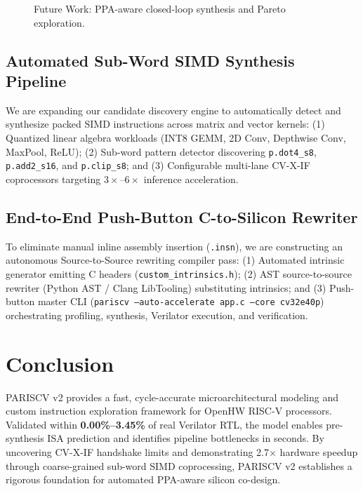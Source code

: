 \documentclass[conference]{IEEEtran}
\begin{document}
\begin{figure}[t]
\centering
{}
\vspace{-3pt}
\caption{Future Work: PPA-aware closed-loop synthesis and Pareto exploration.}
\label{fig:future_arch}
\vspace{-6pt}
\end{figure}

\subsection{Automated Sub-Word SIMD Synthesis Pipeline}
We are expanding our candidate discovery engine to automatically detect and synthesize packed SIMD instructions across matrix and vector kernels: (1) Quantized linear algebra workloads (INT8 GEMM, 2D Conv, Depthwise Conv, MaxPool, ReLU); (2) Sub-word pattern detector discovering \texttt{p.dot4\_s8}, \texttt{p.add2\_s16}, and \texttt{p.clip\_s8}; and (3) Configurable multi-lane CV-X-IF coprocessors targeting $3\times$--$6\times$ inference acceleration.

\subsection{End-to-End Push-Button C-to-Silicon Rewriter}
To eliminate manual inline assembly insertion (\texttt{.insn}), we are constructing an autonomous Source-to-Source rewriting compiler pass: (1) Automated intrinsic generator emitting C headers (\texttt{custom\_intrinsics.h}); (2) AST source-to-source rewriter (Python AST / Clang LibTooling) substituting intrinsics; and (3) Push-button master CLI (\texttt{pariscv --auto-accelerate app.c --core cv32e40p}) orchestrating profiling, synthesis, Verilator execution, and verification.

\section{Conclusion}
PARISCV v2 provides a fast, cycle-accurate microarchitectural modeling and custom instruction exploration framework for OpenHW RISC-V processors. Validated within \textbf{0.00\%--3.45\%} of real Verilator RTL, the model enables pre-synthesis ISA prediction and identifies pipeline bottlenecks in seconds. By uncovering CV-X-IF handshake limits and demonstrating 2.7$\times$ hardware speedup through coarse-grained sub-word SIMD coprocessing, PARISCV v2 establishes a rigorous foundation for automated PPA-aware silicon co-design.
\end{document}
